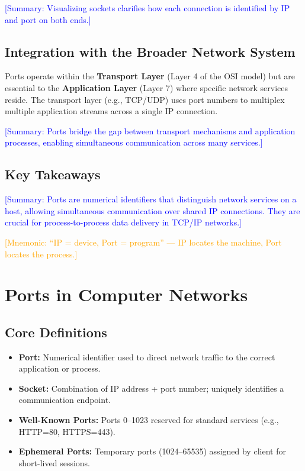 \documentclass[12pt]{article}
\begin{document}
\textcolor{blue}{[Summary: Visualizing sockets clarifies how each connection is identified by IP and port on both ends.]}

\subsection{Integration with the Broader Network System}
Ports operate within the \textbf{Transport Layer} (Layer 4 of the OSI model) but are essential to the \textbf{Application Layer} (Layer 7) where specific network services reside. The transport layer (e.g., TCP/UDP) uses port numbers to multiplex multiple application streams across a single IP connection.

\textcolor{blue}{[Summary: Ports bridge the gap between transport mechanisms and application processes, enabling simultaneous communication across many services.]}

\subsection{Key Takeaways}

\textcolor{blue}{[Summary: Ports are numerical identifiers that distinguish network services on a host, allowing simultaneous communication over shared IP connections. They are crucial for process-to-process data delivery in TCP/IP networks.]}

\textcolor{orange}{[Mnemonic: ``IP = device, Port = program'' — IP locates the machine, Port locates the process.]}


\section{Ports in Computer Networks}

\subsection{Core Definitions}
\begin{itemize}
    \item \textbf{Port:} Numerical identifier used to direct network traffic to the correct application or process.
    \item \textbf{Socket:} Combination of IP address + port number; uniquely identifies a communication endpoint.
    \item \textbf{Well-Known Ports:} Ports 0--1023 reserved for standard services (e.g., HTTP=80, HTTPS=443).
    \item \textbf{Ephemeral Ports:} Temporary ports (1024--65535) assigned by client for short-lived sessions.
\end{itemize}
\end{document}
